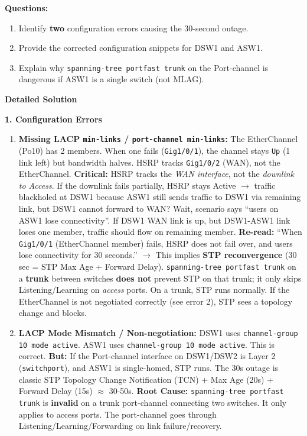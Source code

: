 \documentclass[11pt]{article}
\begin{document}
\begin{exoresolu}
\textbf{Questions:}
\begin{enumerate}
    \item Identify \textbf{two} configuration errors causing the 30-second outage.
    \item Provide the corrected configuration snippets for DSW1 and ASW1.
    \item Explain why \texttt{spanning-tree portfast trunk} on the Port-channel is dangerous if ASW1 is a single switch (not MLAG).
\end{enumerate}
\tcblower
\textbf{Detailed Solution}

\noindent\textbf{1. Configuration Errors}
\begin{enumerate}
    \item \textbf{Missing LACP \texttt{min-links} / \texttt{port-channel min-links}:} The EtherChannel (Po10) has 2 members. When one fails (\texttt{Gig1/0/1}), the channel stays \texttt{Up} (1 link left) but bandwidth halves. HSRP tracks \texttt{Gig1/0/2} (WAN), not the EtherChannel. \textbf{Critical:} HSRP tracks the \emph{WAN interface}, not the \emph{downlink to Access}. If the downlink fails partially, HSRP stays Active $\rightarrow$ traffic blackholed at DSW1 because ASW1 still sends traffic to DSW1 via remaining link, but DSW1 cannot forward to WAN? Wait, scenario says ``users on ASW1 lose connectivity''. If DSW1 WAN link is up, but DSW1-ASW1 link loses one member, traffic should flow on remaining member. \textbf{Re-read:} ``When \texttt{Gig1/0/1} (EtherChannel member) fails, HSRP does not fail over, and users lose connectivity for 30 seconds.'' $\rightarrow$ This implies \textbf{STP reconvergence} (30 sec = STP Max Age + Forward Delay). \texttt{spanning-tree portfast trunk} on a \textbf{trunk} between switches \textbf{does not} prevent STP on that trunk; it only skips Listening/Learning on \emph{access} ports. On a trunk, STP runs normally. If the EtherChannel is not negotiated correctly (see error 2), STP sees a topology change and blocks.
    \item \textbf{LACP Mode Mismatch / Non-negotiation:} DSW1 uses \texttt{channel-group 10 mode active}. ASW1 uses \texttt{channel-group 10 mode active}. This is correct. \textbf{But:} If the Port-channel interface on DSW1/DSW2 is Layer 2 (\texttt{switchport}), and ASW1 is single-homed, STP runs. The 30s outage is classic STP Topology Change Notification (TCN) + Max Age (20s) + Forward Delay (15s) $\approx$ 30-50s. \textbf{Root Cause:} \texttt{spanning-tree portfast trunk} is \textbf{invalid} on a trunk port-channel connecting two switches. It only applies to access ports. The port-channel goes through Listening/Learning/Forwarding on link failure/recovery.
\end{enumerate}


\end{exoresolu}
\end{document}
